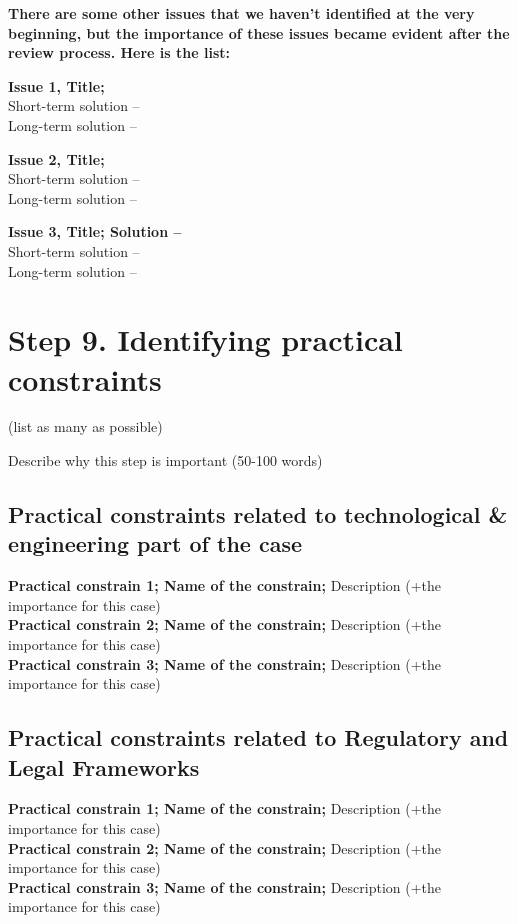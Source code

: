 \documentclass[12pt,a4paper]{article}
\begin{document}
\vspace{0.5cm}
\noindent \textbf{There are some other issues that we haven’t identified at the very beginning, but the importance of these issues became evident after the review process. Here is the list:}

\vspace{0.3cm}
\noindent \textbf{Issue 1, Title;}\\
Short-term solution -- \\
Long-term solution -- 

\vspace{0.3cm}
\noindent \textbf{Issue 2, Title;}\\
Short-term solution -- \\
Long-term solution -- 

\vspace{0.3cm}
\noindent \textbf{Issue 3, Title; Solution --}\\
Short-term solution -- \\
Long-term solution -- 

\section{Step 9. Identifying practical constraints}
(list as many as possible)

\vspace{0.3cm}
\noindent Describe why this step is important (50-100 words)

\subsection*{Practical constraints related to technological \& engineering part of the case}
\noindent \textbf{Practical constrain 1; Name of the constrain;} Description (+the importance for this case)\\
\noindent \textbf{Practical constrain 2; Name of the constrain;} Description (+the importance for this case)\\
\noindent \textbf{Practical constrain 3; Name of the constrain;} Description (+the importance for this case)

\subsection*{Practical constraints related to Regulatory and Legal Frameworks}
\noindent \textbf{Practical constrain 1; Name of the constrain;} Description (+the importance for this case)\\
\noindent \textbf{Practical constrain 2; Name of the constrain;} Description (+the importance for this case)\\
\noindent \textbf{Practical constrain 3; Name of the constrain;} Description (+the importance for this case)
\end{document}
